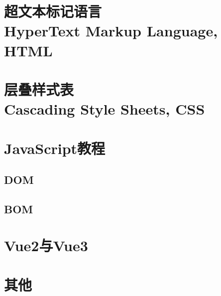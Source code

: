 \documentclass{book}
\begin{document}
\tableofcontents
\part{超文本标记语言\\HyperText Markup Language, HTML}

\part{层叠样式表\\Cascading Style Sheets, CSS}

\part{JavaScript教程}

\chapter{DOM}
\chapter{BOM}
\part{Vue2与Vue3}
\part{其他}

\end{document}
